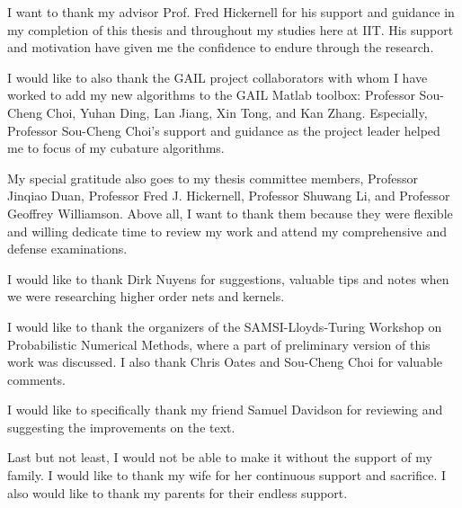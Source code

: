 \documentclass{iitthesis}          %
\begin{document}
\begin{acknowledgement}     %
	\par  I want to thank my advisor Prof. Fred Hickernell for his support and guidance in my completion of this thesis and throughout my studies here at IIT. 
	His support and motivation have given me the confidence to endure through the research. 
	
	I would like to also thank the GAIL project collaborators with
	whom I have worked to add my new algorithms to the GAIL Matlab toolbox: Professor Sou-Cheng Choi,
	Yuhan Ding, Lan Jiang, Xin Tong, and Kan Zhang. Especially, Professor Sou-Cheng Choi’s support and guidance as the project leader helped me to focus of my cubature algorithms.
	
	My special gratitude also goes to my thesis committee members, Professor Jinqiao Duan,
	Professor Fred J. Hickernell, Professor Shuwang Li, and Professor Geoffrey Williamson. Above all, I want to thank them because they were flexible and willing dedicate time to review my work and attend my comprehensive and defense examinations.
	
	I would like to thank Dirk Nuyens for suggestions, valuable tips and notes when we were researching higher order nets and kernels.
	
	I would like to thank the organizers of the SAMSI-Lloyds-Turing Workshop on Probabilistic Numerical Methods, where a part of preliminary version of this work was discussed.  I also thank Chris Oates and Sou-Cheng Choi for valuable comments.
	
	I would like to specifically thank my friend Samuel Davidson for reviewing and suggesting the improvements on the text.
	
	Last but not least, I would not be able to make it without the support of my family. I would like to thank my wife for her continuous support and sacrifice. I also would like to thank my parents for their endless support.


	
\end{acknowledgement}

\tableofcontents
\end{document}
